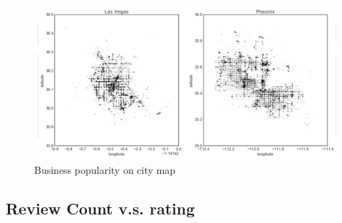 \documentclass{article}
\begin{document}
\begin{figure}[!ht]
\includegraphics[width=\textwidth]{Graph.png}
\caption{Business popularity on city map}
\end{figure}

\subsection{Review Count v.s. rating}
\end{document}
